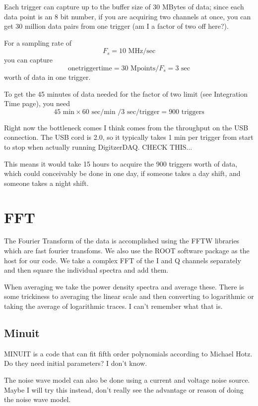 \documentclass[11pt]{article}
\begin{document}
Each trigger can capture up to the buffer size of 30 MBytes of data; since each data point is an 8 bit number, if you are acquiring two channels at once, you can get 30 million data pairs from one trigger (am I a factor of two off here?).

For a sampling rate of $$F_s = 10\text{ MHz}/\text{sec}$$ you can capture $$\text{onetriggertime} = 30 \text{ Mpoints}/F_s = 3 \text{ sec}$$ worth of data in one trigger.

To get the 45 minutes of data needed for the factor of two limit (see Integration Time page), you need $$45\text{ min} \times 60\text{ sec/min }/ 3 \text{ sec/trigger} = 900\text{ triggers}$$

Right now the bottleneck comes I think comes from the throughput on the USB connection. The USB cord is 2.0, so it typically takes 1 min per trigger from start to stop when actually running DigitzerDAQ. CHECK THIS...

This means  it would take 15 hours to acquire the 900 triggers worth of data, which could conceivably be done in one day, if someone takes a day shift, and someone takes a night shift. 

\section{FFT}

The Fourier Transform of the data is accomplished using the FFTW libraries which are fast fourier transfoms. We also use the ROOT software package as the host for our code. We take a complex FFT of the I and Q channels separately and then square the individual spectra and add them.

When averaging we take the power density spectra and average these. There is some trickiness to averaging the linear scale and then converting to logarithmic or taking the average of logarithmic traces. I can't remember what that is.


\subsection{Minuit}

MINUIT is a code that can fit fifth order polynomials according to Michael Hotz. Do they need initial parameters? I don't know.

The noise wave model can also be done using a current and voltage noise source. Maybe I will try this instead, don't really see the advantage or reason of doing the noise wave model.
\end{document}
